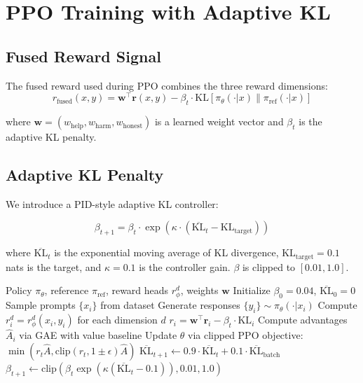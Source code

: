 \documentclass[11pt,a4paper]{article}
\begin{document}
\section{PPO Training with Adaptive KL}

\subsection{Fused Reward Signal}

The fused reward used during PPO combines the three reward dimensions:
\begin{equation}
r_\text{fused}(x,y) = \mathbf{w}^\top \mathbf{r}(x,y) - \beta_t \cdot \text{KL}[\pi_\theta(\cdot|x)\|\pi_\text{ref}(\cdot|x)]
\end{equation}

where $\mathbf{w} = (w_\text{help}, w_\text{harm}, w_\text{honest})$ is a learned
weight vector and $\beta_t$ is the adaptive KL penalty.

\subsection{Adaptive KL Penalty}

We introduce a PID-style adaptive KL controller:

\begin{equation}
\beta_{t+1} = \beta_t \cdot \exp\left(\kappa \cdot \left(\overline{\text{KL}}_t - \text{KL}_\text{target}\right)\right)
\end{equation}

where $\overline{\text{KL}}_t$ is the exponential moving average of KL divergence,
$\text{KL}_\text{target} = 0.1$ nats is the target, and $\kappa = 0.1$ is the
controller gain. $\beta$ is clipped to $[0.01, 1.0]$.

\begin{algorithm}[H]
\caption{PPO with Adaptive KL and Multi-Reward Fusion}
\begin{algorithmic}[1]
\REQUIRE Policy $\pi_\theta$, reference $\pi_\text{ref}$, reward heads $r^d_\phi$, weights $\mathbf{w}$
\STATE Initialize $\beta_0 = 0.04$, $\overline{\text{KL}}_0 = 0$
  \STATE Sample prompts $\{x_i\}$ from dataset
  \STATE Generate responses $\{y_i\} \sim \pi_\theta(\cdot|x_i)$
  \STATE Compute $r^d_i = r^d_\phi(x_i, y_i)$ for each dimension $d$
  \STATE $r_i = \mathbf{w}^\top \mathbf{r}_i - \beta_t \cdot \text{KL}_i$
  \STATE Compute advantages $\hat{A}_i$ via GAE with value baseline
    \STATE Update $\theta$ via clipped PPO objective: $\min(r_t \hat{A}, \text{clip}(r_t, 1\pm\epsilon)\hat{A})$
  \ENDFOR
  \STATE $\overline{\text{KL}}_{t+1} \leftarrow 0.9 \cdot \overline{\text{KL}}_t + 0.1 \cdot \overline{\text{KL}}_{\text{batch}}$
  \STATE $\beta_{t+1} \leftarrow \text{clip}\left(\beta_t \exp(\kappa(\overline{\text{KL}}_t - 0.1)), 0.01, 1.0\right)$
\ENDFOR
\end{algorithmic}
\end{algorithm}
\end{document}
